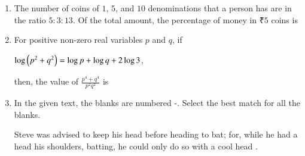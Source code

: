 \documentclass[a4paper, 11pt]{article}
\begin{document}
\begin{enumerate}
    \item The number of coins of \rupee$1$, \rupee$5$, and \rupee$10$ denominations that a person has are in the ratio $5 \colon 3 \colon 13$. Of the total amount, the percentage of money in ₹$5$ coins is
    \begin{enumerate}
    \end{enumerate}
    \hfill{}
    
    \item For positive non-zero real variables $p$ and $q$, if
    \begin{center}
    $\log\left(p^{2}+q^{2}\right)=\log p+\log q+2 \log 3$,
    \end{center}
    then, the value of $\frac{p^{4}+q^{4}}{p^{2}q^{2}}$ is
    \begin{enumerate}
    \end{enumerate}
    
    \hfill{}
    \item In the given text, the blanks are numbered -. Select the best match for all the blanks.
    
    Steve was advised to keep his head \underline{\hspace{1cm}}\underline{\hspace{1cm}} before heading \underline{\hspace{1cm}}\underline{\hspace{1cm}} to bat; for, while he had a head \underline{\hspace{1cm}}\underline{\hspace{1cm}} his shoulders, batting, he could only do so with a cool head \underline{\hspace{1cm}}\underline{\hspace{1cm}}.


\end{enumerate}
\end{document}
